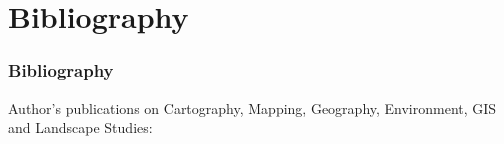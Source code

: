 \documentclass[pdflatex,compress,8pt,
	xcolor={dvipsnames,dvipsnames,svgnames,x11names,table},
	hyperref={	
	breaklinks = true, 
	pdfauthor={Lemenkova Polina}, 
	pdfsubject={Preentation}, 
	pdfcreator={Lemenkova Polina}, 
	pdfproducer={Lemenkova Polina}, 
	colorlinks=true,
	linkcolor=Tomato, 
	citecolor=DeepPink3, 
	urlcolor = NavyBlue, 
	breaklinks = true}]{beamer}
\begin{document}

\section{Bibliography}
\begin{frame}[allowframebreaks]\frametitle{Bibliography}
\vspace{3em}
\footnotesize{Author's publications on Cartography, Mapping, Geography, Environment, GIS and Landscape Studies:}
	\nocite{*}
	\printbibliography[heading=none]
\end{frame}

\end{document}
